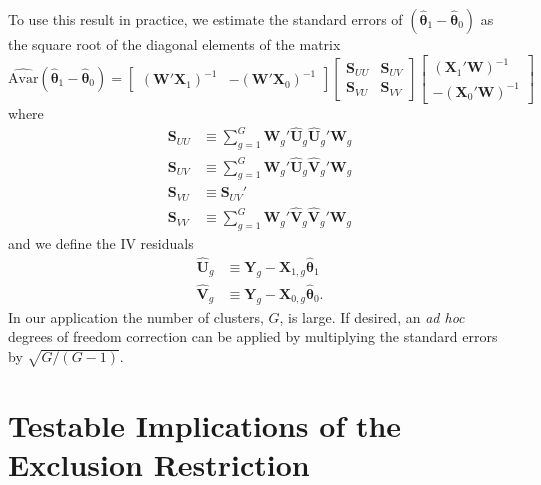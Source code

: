 To use this result in practice, we estimate the standard errors of  $(\widehat{\boldsymbol{\theta}}_1 - \widehat{\boldsymbol{\theta}}_0)$ as the square root of the diagonal elements of the matrix
\[
\widehat{\text{Avar}}(\widehat{\boldsymbol{\theta}}_1 - \widehat{\boldsymbol{\theta}}_0) 
= \begin{bmatrix}
\left(\mathbf{W}'\mathbf{X}_1\right)^{-1} &
-\left(\mathbf{W}'\mathbf{X}_0\right)^{-1} 
\end{bmatrix}
\begin{bmatrix}
\mathbf{S}_{UU}& \mathbf{S}_{UV}\\
\mathbf{S}_{VU}& \mathbf{S}_{VV}
\end{bmatrix} 
\begin{bmatrix}
\left(\mathbf{X}_1'\mathbf{W}\right)^{-1} \\
-\left(\mathbf{X}_0'\mathbf{W}\right)^{-1} 
\end{bmatrix}
\]
where
\begin{align*}
\mathbf{S}_{UU} &\equiv \sum_{g=1}^G \mathbf{W}_g' \widehat{\mathbf{U}}_g \widehat{\mathbf{U}}_g' \mathbf{W}_g\\
\mathbf{S}_{UV} &\equiv \sum_{g=1}^G \mathbf{W}_g' \widehat{\mathbf{U}}_g \widehat{\mathbf{V}}_g' \mathbf{W}_g\\
\mathbf{S}_{VU} &\equiv \mathbf{S}_{UV}'\\
\mathbf{S}_{VV} &\equiv \sum_{g=1}^G \mathbf{W}_g' \widehat{\mathbf{V}}_g \widehat{\mathbf{V}}_g' \mathbf{W}_g
\end{align*}
and we define the IV residuals
\begin{align*}
\widehat{\mathbf{U}}_g &\equiv \mathbf{Y}_g - \mathbf{X}_{1,g}\widehat{\boldsymbol{\theta}}_1\\
\widehat{\mathbf{V}}_g &\equiv \mathbf{Y}_g - \mathbf{X}_{0,g}\widehat{\boldsymbol{\theta}}_0.
\end{align*}
In our application the number of clusters, $G$, is large.
If desired, an \emph{ad hoc} degrees of freedom correction can be applied by multiplying the standard errors by $\sqrt{G/(G-1)}$.


\section{Testable Implications of the Exclusion Restriction}
\label{append:exclusion}

\normalsize
\linespread{1.25}
\normalsize
\linespread{1.25}

